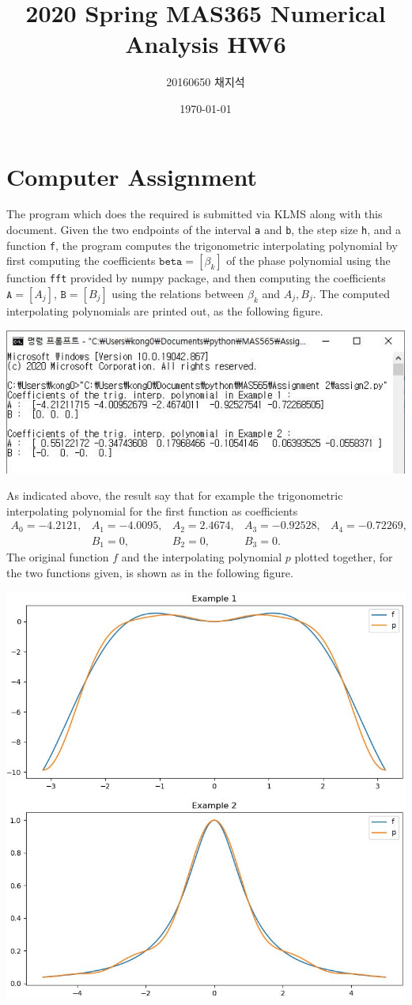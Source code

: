 \documentclass{article}
\title{2020 Spring MAS365 Numerical Analysis HW6}
\author{20160650 채지석}
\date{\today}
\begin{document}
\section*{Computer Assignment}
The program which does the required is submitted via KLMS along with this document. Given the two endpoints of the interval \texttt{a} and \texttt{b}, the step size \texttt{h}, and a function \texttt{f}, the program computes the trigonometric interpolating polynomial by first computing the coefficients $\texttt{beta} = [\beta_k]$ of the phase polynomial using the function \texttt{fft} provided by \textsf{numpy} package, and then computing the coefficients $\texttt{A} = [A_j]$, $\texttt{B} = [B_j]$ using the relations between $\beta_k$ and $A_j, B_j$. The computed interpolating polynomials are printed out, as the following figure. 
\begin{center}
    \includegraphics[width=0.8\linewidth]{console.JPG}
\end{center}
As indicated above, the result say that for example the trigonometric interpolating polynomial for the first function as coefficients 
\[
\begin{array}{lllll}
  A_0 = -4.2121, & A_1 = -4.0095, & A_2 = 2.4674, & A_3 = -0.92528, &  A_4 = -0.72269, \\
  & B_1 = 0, & B_2 = 0, & B_3 = 0. &
\end{array}  
\]
The original function $f$ and the interpolating polynomial $p$ plotted together, for the two functions given, is shown as in the following figure. 
\begin{center}
    \includegraphics[width=0.85\linewidth]{3313.JPG}
\end{center} \par 
\end{document}
